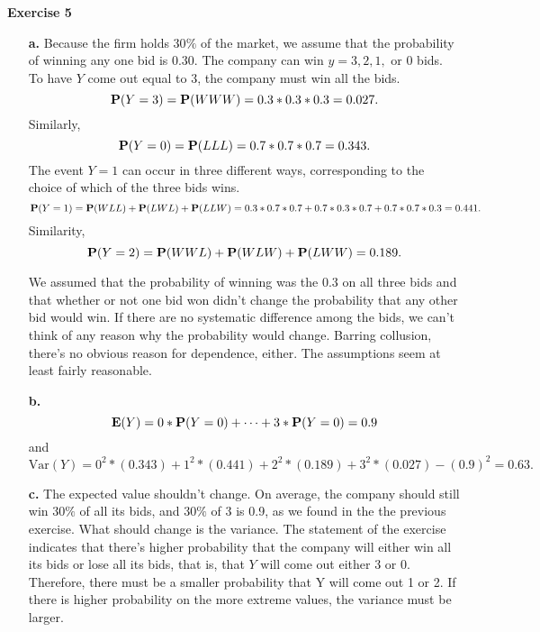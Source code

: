 \documentclass[10pt]{article}
\def\Pr{{\bf P}}
\def\E{{\bf E}}
\begin{document}
{\bf Exercise 5}
\begin{itemize}
\item[\bf a.] Because the firm holds 30$\%$ of the market, we assume that the probability of winning any one bid is 0.30. The company can win $y=3,2,1, \mbox{ or } 0$ bids. To have $Y$ come out equal to 3, the company must win all the bids.
$$\Pr(Y=3)=\Pr(WWW)=0.3*0.3*0.3=0.027.$$
Similarly,
$$\Pr(Y=0)=\Pr(LLL)=0.7*0.7*0.7=0.343.$$
The event $Y=1$ can occur in three different ways, corresponding to the choice of which of the three bids wins.
$$\Pr(Y=1)=\Pr(WLL)+\Pr(LWL)+\Pr(LLW)=0.3*0.7*0.7+0.7*0.3*0.7+0.7*0.7*0.3=0.441.$$
Similarity,
$$\Pr(Y=2)=\Pr(WWL)+\Pr(WLW)+\Pr(LWW)=0.189.$$

We assumed that the probability of winning was the 0.3 on all three bids and that whether or not one bid won didn't change the probability that any other bid would win. If there are no systematic difference among the bids, we can't think of any reason why the probability would change. Barring  collusion, there's no obvious reason for dependence, either. The assumptions seem at least fairly reasonable.
  
\item[\bf b.] $$\E(Y)=0*\Pr(Y=0)+\cdots+3*\Pr(Y=0)=0.9$$
and
$$\mbox{Var}(Y)=0^2*(0.343)+1^2*(0.441)+2^2*(0.189)+3^2*(0.027)-(0.9)^2=0.63.$$
\item[\bf c.] The expected value shouldn't change. On average, the company 
should still win 30$\%$ of all its bids, and 30$\%$ of 3 is 0.9, as we found 
in the the previous exercise.  What should change is the variance. The 
statement of the exercise indicates that there's higher probability that the 
company will either win all its bids or lose all its bids, that is, that $Y$ 
will come out either 3 or 0. Therefore, there must be a smaller probability 
that Y will come out 1 or 2. If there is higher probability on the more 
extreme values, the variance must be larger.
\end{itemize}
\end{document}
